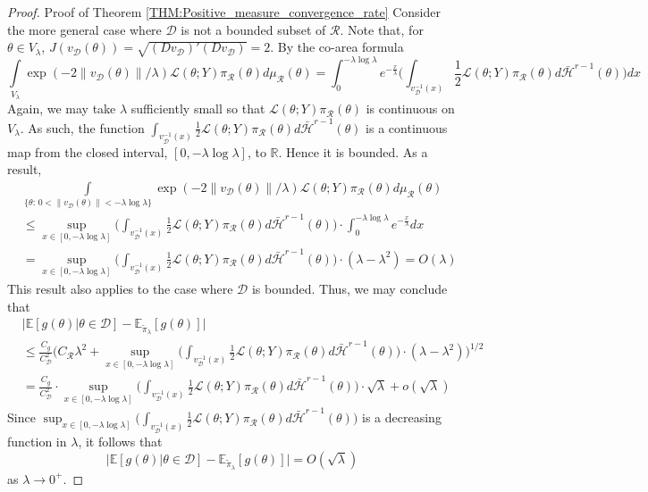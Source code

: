 \documentclass[10pt,fleqn]{article}
\newcommand{\bb}[1]{\mathbb{#1}} \newcommand{\mc}[1]{\mathcal{#1}}
\DeclareMathOperator{\1}{\mathbbm{1}} \DeclareMathOperator{\bigO}{\mc O}
\begin{document}
\begin{proof}{Proof of Theorem \ref{THM:Positive_measure_convergence_rate}}
Consider the more general case where $\mathcal{D}$ is not a bounded subset of $\mathcal{R}.$ Note that, for $\theta \in V_\lambda$, $J(v_{\mc D}(\theta))=\sqrt{(Dv_{\mc D})'(Dv_{\mc D})} = 2.$ By the co-area formula \cite{diaconis2013manifold,federer2014geometric}
$$\int\limits_{V_\lambda}\exp(-2\|v_{\mc D}(\theta)\|/\lambda )\mathcal{L}(\theta;Y)\pi_\mathcal{R}(\theta) d\mu_\mathcal{R}(\theta)  = \int_0^{-\lambda\log\lambda} e^{-\frac{x}{\lambda}}\bigg( \int_{v_{\mc D}^{-1}(x)} \frac{1}{2}\mathcal{L}(\theta;Y) \pi_\mathcal{R}(\theta) d\bar{\mathcal{H}}^{r-1}(\theta)\bigg) dx$$
Again, we may take $\lambda$ sufficiently small so that $\mathcal{L}(\theta;Y) \pi_\mathcal{R}(\theta) $ is continuous on $V_\lambda.$  As such, the function $ \int_{v_{\mc D}^{-1}(x)} \frac{1}{2}\mathcal{L}(\theta;Y) \pi_\mathcal{R}(\theta) d\bar{\mathcal{H}}^{r-1}(\theta)$ is a continuous map from the closed interval, $[0,-\lambda\log\lambda]$, to $\mathbb{R}.$ Hence it is bounded.  As a result, 
\begin{align*}
&\int\limits_{\{\theta: \, 0< \|v_{\mc D}(\theta)\|< -\lambda\log\lambda\}}\exp(-2\|v_{\mc D}(\theta)\|/\lambda )\mathcal{L}(\theta;Y)\pi_\mathcal{R}(\theta) d\mu_\mathcal{R}(\theta) \\
&\le \sup_{x \in [0,-\lambda\log\lambda]} \bigg( \int_{v_{\mc D}^{-1}(x)} \frac{1}{2}\mathcal{L}(\theta;Y) \pi_\mathcal{R}(\theta) d\bar{\mathcal{H}}^{r-1}(\theta)\bigg) \cdot \int_0^{-\lambda\log \lambda} e^{-\frac{x}{\lambda}}dx \\
& = \sup_{x \in [0,-\lambda\log\lambda]} \bigg( \int_{v_{\mc D}^{-1}(x)} \frac{1}{2}\mathcal{L}(\theta;Y) \pi_\mathcal{R}(\theta) d\bar{\mathcal{H}}^{r-1}(\theta)\bigg)  \cdot (\lambda - \lambda^2) = O(\lambda)
\end{align*}
This result also applies to the case where $\mathcal{D}$ is bounded.  Thus, we may conclude that
\begin{align*}
&\big| \bb E[g(\theta)|\theta\in\mathcal{D}]-\bb E_{\tilde{\pi}_\lambda}[g(\theta)]\big|\\
& \le  \frac{C_{g}}{C_\mathcal{D}^2}\bigg(C_\mathcal{R}\lambda^2 + \sup_{x \in [0,-\lambda\log\lambda]} \bigg( \int_{v_{\mc D}^{-1}(x)} \frac{1}{2}\mathcal{L}(\theta;Y) \pi_\mathcal{R}(\theta) d\bar{\mathcal{H}}^{r-1}(\theta)\bigg)  \cdot (\lambda - \lambda^2) \bigg)^{1/2} \\
&= \frac{C_{g}}{C_\mathcal{D}^2} \cdot \sup_{x \in [0,-\lambda\log\lambda]} \bigg( \int_{v_{\mc D}^{-1}(x)} \frac{1}{2}\mathcal{L}(\theta;Y) \pi_\mathcal{R}(\theta) d\bar{\mathcal{H}}^{r-1}(\theta)\bigg)  \cdot \sqrt{\lambda} + o(\sqrt{\lambda})
\end{align*}
Since $\sup_{x \in [0,-\lambda\log\lambda]} \bigg( \int_{v_{\mc D}^{-1}(x)} \frac{1}{2}\mathcal{L}(\theta;Y) \pi_\mathcal{R}(\theta) d\bar{\mathcal{H}}^{r-1}(\theta)\bigg)$ is a decreasing function in $\lambda$, it follows that $$\big| \bb E[g(\theta)|\theta\in\mathcal{D}]-\bb E_{\tilde{\pi}_\lambda}[g(\theta)]\big| = O(\sqrt{\lambda})$$
as $\lambda \to 0^+.$
\end{proof}
\end{document}
